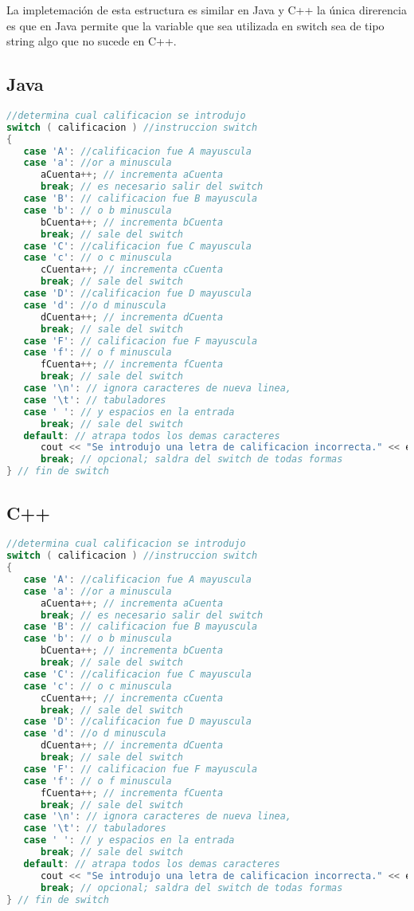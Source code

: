 La impletemación de esta estructura es similar en Java y C++ la única direrencia es que en Java permite que la variable que sea utilizada en switch sea de tipo string algo que no sucede en C++.

\subsection{Java}
\begin{lstlisting}[language=Java]
//determina cual calificacion se introdujo
switch ( calificacion ) //instruccion switch
{
   case 'A': //calificacion fue A mayuscula
   case 'a': //or a minuscula
      aCuenta++; // incrementa aCuenta
      break; // es necesario salir del switch
   case 'B': // calificacion fue B mayuscula
   case 'b': // o b minuscula
      bCuenta++; // incrementa bCuenta
      break; // sale del switch
   case 'C': //calificacion fue C mayuscula
   case 'c': // o c minuscula
      cCuenta++; // incrementa cCuenta
      break; // sale del switch
   case 'D': //calificacion fue D mayuscula
   case 'd': //o d minuscula
      dCuenta++; // incrementa dCuenta
      break; // sale del switch
   case 'F': // calificacion fue F mayuscula
   case 'f': // o f minuscula
      fCuenta++; // incrementa fCuenta
      break; // sale del switch
   case '\n': // ignora caracteres de nueva linea,
   case '\t': // tabuladores
   case ' ': // y espacios en la entrada
      break; // sale del switch
   default: // atrapa todos los demas caracteres
      cout << "Se introdujo una letra de calificacion incorrecta." << endl;
      break; // opcional; saldra del switch de todas formas
} // fin de switch	
\end{lstlisting}


\subsection{C++}
\begin{lstlisting}[language=C++]
//determina cual calificacion se introdujo
switch ( calificacion ) //instruccion switch
{
   case 'A': //calificacion fue A mayuscula
   case 'a': //or a minuscula
      aCuenta++; // incrementa aCuenta
      break; // es necesario salir del switch
   case 'B': // calificacion fue B mayuscula
   case 'b': // o b minuscula
      bCuenta++; // incrementa bCuenta
      break; // sale del switch
   case 'C': //calificacion fue C mayuscula
   case 'c': // o c minuscula
      cCuenta++; // incrementa cCuenta
      break; // sale del switch
   case 'D': //calificacion fue D mayuscula
   case 'd': //o d minuscula
      dCuenta++; // incrementa dCuenta
      break; // sale del switch
   case 'F': // calificacion fue F mayuscula
   case 'f': // o f minuscula
      fCuenta++; // incrementa fCuenta
      break; // sale del switch
   case '\n': // ignora caracteres de nueva linea,
   case '\t': // tabuladores
   case ' ': // y espacios en la entrada
      break; // sale del switch
   default: // atrapa todos los demas caracteres
      cout << "Se introdujo una letra de calificacion incorrecta." << endl;
      break; // opcional; saldra del switch de todas formas
} // fin de switch	
\end{lstlisting}

